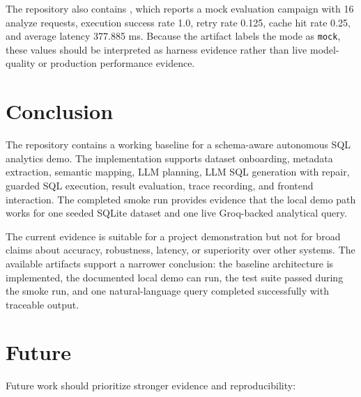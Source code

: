 \documentclass[12pt,a4paper]{article}
\begin{document}
The repository also contains , which reports a mock evaluation campaign with 16 analyze requests, execution success rate 1.0, retry rate 0.125, cache hit rate 0.25, and average latency 377.885 ms. Because the artifact labels the mode as \texttt{mock}, these values should be interpreted as harness evidence rather than live model-quality or production performance evidence.

\section{Conclusion}

The repository contains a working baseline for a schema-aware autonomous SQL analytics demo. The implementation supports dataset onboarding, metadata extraction, semantic mapping, LLM planning, LLM SQL generation with repair, guarded SQL execution, result evaluation, trace recording, and frontend interaction. The completed smoke run provides evidence that the local demo path works for one seeded SQLite dataset and one live Groq-backed analytical query.

The current evidence is suitable for a project demonstration but not for broad claims about accuracy, robustness, latency, or superiority over other systems. The available artifacts support a narrower conclusion: the baseline architecture is implemented, the documented local demo can run, the test suite passed during the smoke run, and one natural-language query completed successfully with traceable output.

\section{Future}

Future work should prioritize stronger evidence and reproducibility:
\end{document}
